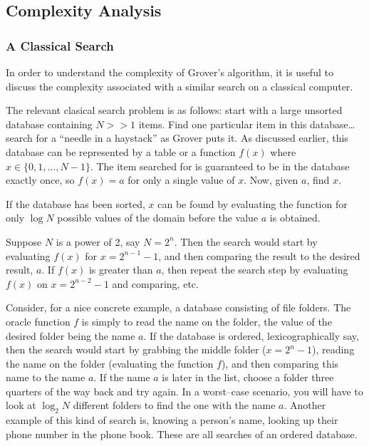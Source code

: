 \subsection{Complexity Analysis}

\subsubsection{A Classical Search}

In order to understand the complexity of Grover's algorithm,
it is useful to discuss the complexity associated with a 
similar search on a classical computer.

The relevant clasical search problem is as follows:  
start with a large unsorted database containing $N>>1$ items.
Find one particular item in this database\dots
search for a ``needle in a haystack'' as Grover puts
it\cite{Grover:96}.  As discussed earlier, this database can 
be represented by a table or a function $f(x)$ where
$x\in\lbrace 0,1,\ldots,N-1\rbrace$.
The item searched for is guaranteed to be in the database
exactly once, so $f(x)=a$ for only a single 
value of $x$. Now, given $a$, find $x$.

If the database has been sorted, $x$ can be found by 
evaluating the function for only $\log N$ possible 
values of the domain before the value $a$ is obtained.

Suppose $N$ is a power of 2, say $N=2^n$.  Then the search
would start by evaluating $f(x)$ for $x=2^{n-1}-1$,
and then comparing the result to the desired result, $a$.
If $f(x)$ is greater than $a$, then repeat the search
step by evaluating $f(x)$ on $x=2^{n-2}-1$ and comparing,
etc.  

Consider, for a nice concrete example, a database consisting
of file folders.  The oracle function $f$ is simply to read
the name on the folder, the value of the desired folder being
the name $a$.  If the database is ordered, lexicographically say,
then the search would start by grabbing the middle folder
($x=2^n-1$), reading the name on the folder (evaluating the
function $f$), and then comparing this name to the name $a$.
If the name $a$ is later in the list, choose a folder three
quarters of the way back and try again.  In a worst--case
scenario, you will have to look at $\log_2 N$ different 
folders to find the one with the name $a$.  
Another example of this kind of search
is, knowing a person's name, looking up their phone number in
the phone book.  These are all searches of an ordered database.


